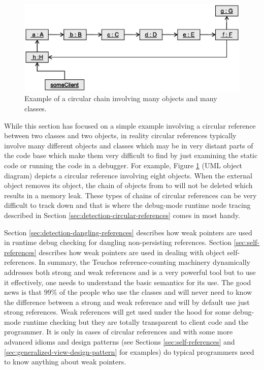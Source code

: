 \documentclass[pdf,ps2pdf,11pt]{SANDreport}
\begin{document}
{\bsinglespace
\begin{figure}
\begin{center}
\includegraphics*[angle=0,scale=0.65]{CircularChain}
\end{center}
\caption{
\label{fig:CircularChain}
Example of a circular chain involving many objects and many classes.}
\end{figure}
\esinglespace}


While this section has focused on a simple example involving a
circular reference between two classes and two objects, in reality
circular references typically involve many different objects and
classes which may be in very distant parts of the code base which make
them very difficult to find by just examining the static code or
running the code in a debugger.  For example, Figure
{}\ref{fig:CircularChain} (UML object diagram) depicts a circular
reference involving eight objects.  When the external
{} object removes its {} object, the chain
of objects from {} to {} will not be deleted which
results in a memory leak.  These types of chains of circular
references can be very difficult to track down and that is where the
debug-mode runtime node tracing described in Section
{}\ref{sec:detection-circular-references} comes in most handy.

Section {}\ref{sec:detection-dangling-references} describes how weak
pointers are used in runtime debug checking for dangling
non-persisting references.  Section {}\ref{sec:self-references}
describes how weak pointers are used in dealing with object
self-references.  In summary, the Teuchos reference-counting machinery
dynamically addresses both strong and weak references and is a very
powerful tool but to use it effectively, one needs to understand the
basic semantics for its use.  The good news is that 99\% of the people
who use the classes {} and {} will never need
to know the difference between a strong and weak reference and will by
default use just strong references.  Weak references will get used
under the hood for some debug-mode runtime checking but they are
totally transparent to client code and the programmer.  It is only in
cases of circular references and with some more advanced idioms and
design patterns (see Sections {}\ref{sec:self-references} and
{}\ref{sec:generalized-view-design-pattern} for examples) do typical
programmers need to know anything about weak pointers.
\end{document}

